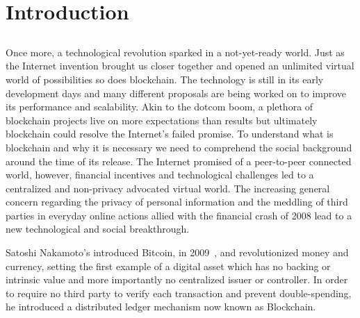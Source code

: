 \chapter{Introduction} \label{chap:intro}

\section*{}



Once more, a technological revolution sparked in a not-yet-ready world. Just as the Internet invention brought us closer together and opened an unlimited virtual world of possibilities so does blockchain. The technology is still in its early development days and many different proposals are being worked on to improve its performance and scalability. Akin to the dotcom boom, a plethora of blockchain projects live on more expectations than results but ultimately blockchain could resolve the Internet's failed promise. To understand what is blockchain and why it is necessary we need to comprehend the social background around the time of its release. The Internet promised of a peer-to-peer connected world, however,
 financial incentives and technological challenges led to a centralized and non-privacy advocated virtual world. The increasing general concern regarding the privacy of personal information and the meddling of third parties in everyday online actions allied with the financial crash of 2008 lead to a new technological and social breakthrough.

Satoshi Nakamoto's introduced Bitcoin, in 2009~\citet{Nakamoto2009}, and revolutionized money and currency, setting the first example of a digital asset which has no backing or intrinsic value and more importantly no centralized issuer or controller. In order to require no third party to verify each transaction and prevent double-spending, he introduced a distributed ledger mechanism now known as Blockchain.



